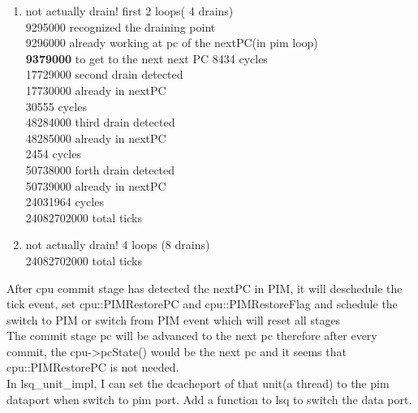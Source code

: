 \documentclass[11pt]{article}
\begin{document}
\begin{enumerate}
  \item not actually drain! first 2 loops( 4 drains)\\
  9295000 recognized the draining point\\
  9296000 already working at pc of the nextPC(in pim loop)\\
  \textbf{9379000} to get to the next next PC
  8434 cycles\\
  17729000 second drain detected\\
  17730000 already in nextPC\\
  30555 cycles\\
  48284000 third drain detected\\
  48285000 already in nextPC\\
  2454 cycles\\
  50738000 forth drain detected\\
  50739000 already in nextPC\\
  24031964 cycles\\
  24082702000 total ticks\\
  
  \item not actually drain! 4 loops (8 drains)\\
  24082702000 total ticks
		
	
\end{enumerate}

\begin{table}[h!]
 \caption{tick time line}
 \label{tab:sum}
\end{table}

After cpu commit stage has detected the nextPC in PIM, it will deschedule the tick event, set cpu::PIMRestorePC and cpu::PIMRestoreFlag and schedule the switch to PIM or switch from PIM event which will reset all stages\\

The commit stage pc will be advanced to the next pc therefore after every commit, the cpu->pcState() would be the next pc and it seems that cpu::PIMRestorePC is not needed.\\

In lsq\_unit\_impl, I can set the dcacheport of that unit(a thread) to the pim dataport when switch to pim port. Add a function to lsq to switch the data port.
\end{document}
